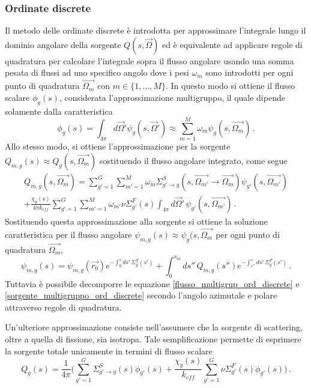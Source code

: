 \subsubsection{Ordinate discrete}
Il metodo delle ordinate discrete è introdotta per approssimare l'integrale 
lungo il dominio angolare della sorgente $Q(s,\vec{\Omega})$ ed è equivalente ad 
applicare regole di quadratura per calcolare l'integrale sopra il flusso 
angolare usando una somma pesata di flussi ad uno specifico angolo dove i pesi 
$\omega_m$ sono introdotti per ogni punto di quadratura $\vec{\Omega_m}$ con $m 
\in \{1,\dots,M\}$.
In questo modo si ottiene il flusso scalare $\phi_g(s)$, considerata 
l'approssimazione multigruppo, il quale dipende solamente dalla caratteristica
\begin{equation}
\label{flusso_multigrup_ord_discrete}
\phi_g(s)=\int_{4\pi}d\vec{\Omega}'\psi_g(s,\vec{\Omega}') \approx \sum_{m=1}^M 
\omega_m \psi_g(s,\vec{\Omega_m}) \,.
\end{equation}
Allo stesso modo, si ottiene l'approssimazione per la sorgente $Q_{m,g}(s) 
\approx Q_g(s,\vec{\Omega_m})$ sostituendo il flusso angolare integrato, come 
segue
\begin{multline}
\label{sorgente_multigruppo_ord_discrete}
Q_{m,g}(s,\vec{\Omega_m})=\sum_{g'=1}^G \sum_{m'=1}^M \omega_m  \Sigma_{g' 
\rightarrow g}^S (s,\vec{\Omega_{m'}}\rightarrow 
\vec{\Omega_m})\psi_{g'}(s,\vec{\Omega_{m'}})\\
+\frac{\chi_g(s)}{4\pi k_{eff}}\sum_{g'=1}^G \sum_{m'=1}^M \omega_{m'}\nu 
\Sigma_{g'}^F (s) \int_{4\pi}d\vec{\Omega}'\, \psi_{g'}(s,\vec{\Omega_{m'}}) \,.
\end{multline}
Sostituendo questa approssimazione alla sorgente si ottiene la soluzione 
caratteristica per il flusso angolare $\psi_{m,g}(s)\approx 
\psi_g(s,\vec{\Omega_m}$ per ogni punto di quadratura $\vec{\Omega_m}$,
\begin{equation}
\psi_{m,g}(s)=\psi_{m,g}(\vec{r_0})e^{-\int_0^s ds' \, 
\Sigma_g^T(s')}+\int_0^{s_m} ds'' \, Q_{m,g}(s'')e^{-\int_{s''}^s ds' \, 
\Sigma_g^T(s')} \,.
\end{equation}
Tuttavia è possibile decomporre le equazione \eqref{flusso_multigrup_ord_discrete} e \eqref{sorgente_multigruppo_ord_discrete} secondo l'angolo azimutale 
e polare attraverso regole di quadratura.

Un'ulteriore approssimazione consiste nell'assumere che la sorgente di 
scattering, oltre a quella di fissione, sia isotropa. Tale semplificazione 
permette di esprimere la sorgente totale unicamente in termini di flusso 
scalare
\begin{equation}
\label{sorgente_isotropa_od}
Q_g(s)=\frac{1}{4\pi}\biggl(\sum_{g'=1}^G \Sigma_{g'\rightarrow 
g}^S(s)\phi_{g'}(s)+\frac{\chi_g(s)}{k_{eff}}\sum_{g'=1}^G\nu 
\Sigma_{g'}^F(s)\phi_{g'}(s)\biggr) \,.
\end{equation}

